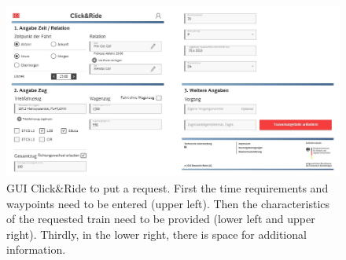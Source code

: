 \begin{figure}[htb]
	\centering
	\includegraphics[width=\textwidth]{Bilder/request.jpg}
	\caption{GUI Click\&Ride to put a request. First the time requirements and waypoints need to be entered (upper left). Then the characteristics of the requested train need to be provided (lower left and upper right). Thirdly, in the lower right, there is space for additional information.}
	\label{fig:CnR_request}
\end{figure}

